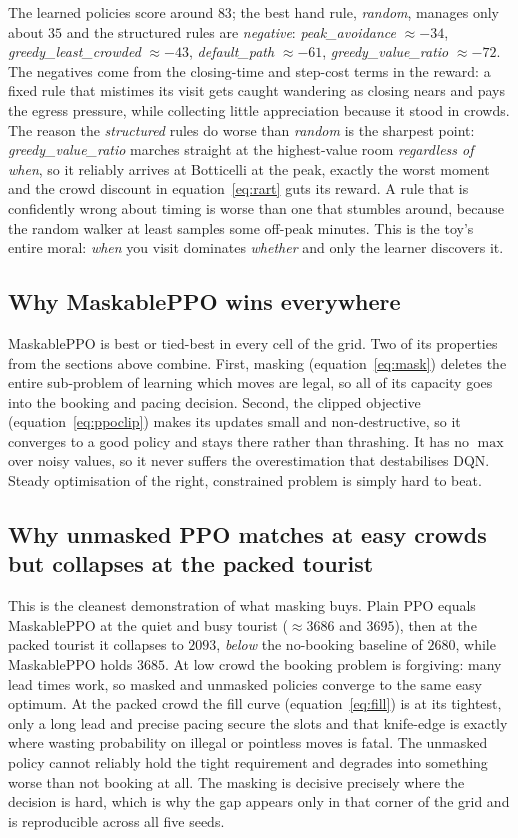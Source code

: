 \documentclass[11pt]{article}
\newcommand{\key}[1]{\textit{#1}}            %
\newcommand{\why}[1]{\textcolor{inkblue}{#1}}
\begin{document}
The learned policies score around $83$; the best hand rule, \key{random}, manages only
about $35$ and the structured rules are \emph{negative}: \key{peak\_avoidance} $\approx -34$,
\key{greedy\_least\_crowded} $\approx -43$, \key{default\_path} $\approx -61$,
\key{greedy\_value\_ratio} $\approx -72$. \why{The negatives come from the closing-time and
step-cost terms in the reward: a fixed rule that mistimes its visit gets caught wandering
as closing nears and pays the egress pressure, while collecting little appreciation because
it stood in crowds.} The reason the \emph{structured} rules do worse than \emph{random} is
the sharpest point: \key{greedy\_value\_ratio} marches straight at the highest-value room
\emph{regardless of when}, so it reliably arrives at Botticelli at the peak, exactly the
worst moment and the crowd discount in equation~\eqref{eq:rart} guts its reward. A rule
that is confidently wrong about timing is worse than one that stumbles around, because the
random walker at least samples some off-peak minutes. This is the toy's entire moral:
\emph{when} you visit dominates \emph{whether} and only the learner discovers it.

\subsection{Why MaskablePPO wins everywhere}

MaskablePPO is best or tied-best in every cell of the grid. \why{Two of its properties from
the sections above combine. First, masking (equation~\eqref{eq:mask}) deletes the entire
sub-problem of learning which moves are legal, so all of its capacity goes into the booking
and pacing decision. Second, the clipped objective (equation~\eqref{eq:ppoclip}) makes its
updates small and non-destructive, so it converges to a good policy and stays there rather
than thrashing.} It has no $\max$ over noisy values, so it never suffers the overestimation
that destabilises DQN. Steady optimisation of the right, constrained problem is simply hard
to beat.

\subsection{Why unmasked PPO matches at easy crowds but collapses at the packed tourist}

This is the cleanest demonstration of what masking buys. Plain PPO equals MaskablePPO at
the quiet and busy tourist ($\approx 3686$ and $3695$), then at the packed tourist it
collapses to $2093$, \emph{below} the no-booking baseline of $2680$, while MaskablePPO holds
$3685$. \why{At low crowd the booking problem is forgiving: many lead times work, so masked
and unmasked policies converge to the same easy optimum. At the packed crowd the fill curve
(equation~\eqref{eq:fill}) is at its tightest, only a long lead and precise pacing secure
the slots and that knife-edge is exactly where wasting probability on illegal or pointless
moves is fatal. The unmasked policy cannot reliably hold the tight requirement and degrades
into something worse than not booking at all.} The masking is decisive precisely where the
decision is hard, which is why the gap appears only in that corner of the grid and is
reproducible across all five seeds.
\end{document}
